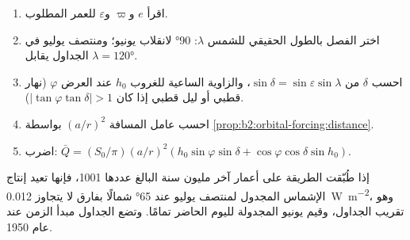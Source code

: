 \begin{method}\label{met:b2:orbital-forcing:curve}
\begin{enumerate}
  \item اقرأ $e$ و$\varpi$ و$\varepsilon$ للعمر المطلوب.
  \item اختر الفصل بالطول الحقيقي للشمس $\lambda$: \ang{90} لانقلاب يونيو؛
        ومنتصف يوليو في الجداول يقابل $\lambda = \ang{120}$.
  \item احسب $\delta$ من $\sin\delta = \sin\varepsilon\sin\lambda$، والزاوية الساعية
        للغروب $h_0$ عند العرض $\varphi$ (نهار قطبي أو ليل قطبي إذا كان $|\tan\varphi\tan\delta| > 1$).
  \item احسب عامل المسافة $(a/r)^2$ بواسطة \cref{prop:b2:orbital-forcing:distance}.
  \item اضرب: $\bar Q = (S_0/\pi)(a/r)^2(h_0\sin\varphi\sin\delta +
        \cos\varphi\cos\delta\sin h_0)$.
\end{enumerate}
\end{method}

إذا طُبّقت الطريقة على أعمار آخر مليون سنة البالغ عددها 1001، فإنها تعيد إنتاج الإشماس المجدول لمنتصف يوليو
عند \ang{65} شمالًا بفارق لا يتجاوز \qty{0.012}{W.m^{-2}}، وهو تقريب الجداول،
وقيم يونيو المجدولة لليوم الحاضر تمامًا. وتضع الجداول مبدأ الزمن عند عام 1950.

